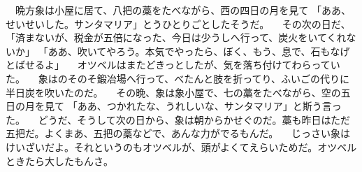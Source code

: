 　晩方象は小屋に居て、八把の藁をたべながら、西の四日の月を見て
「ああ、せいせいした。サンタマリア」とうひとりごとしたそうだ。
　その次の日だ、
「済まないが、税金が五倍になった、今日は少うしへ行って、炭火をいてくれないか」
「ああ、吹いてやろう。本気でやったら、ぼく、もう、息で、石もなげとばせるよ」
　オツベルはまたどきっとしたが、気を落ち付けてわらっていた。
　象はのそのそ鍛冶場へ行って、べたんと肢を折ってり、ふいごの代りに半日炭を吹いたのだ。
　その晩、象は象小屋で、七の藁をたべながら、空の五日の月を見て
「ああ、つかれたな、うれしいな、サンタマリア」と斯う言った。
　どうだ、そうして次の日から、象は朝からかせぐのだ。藁も昨日はただ五把だ。よくまあ、五把の藁などで、あんな力がでるもんだ。
　じっさい象はけいざいだよ。それというのもオツベルが、頭がよくてえらいためだ。オツベルときたら大したもんさ。
　
